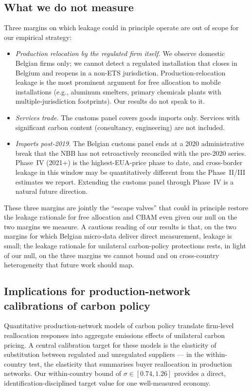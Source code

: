 \subsection{What we do not measure}

Three margins on which leakage could in principle operate are out of scope for our empirical strategy:

\begin{itemize}
    \item \emph{Production relocation by the regulated firm itself.} We observe domestic Belgian firms only; we cannot detect a regulated installation that closes in Belgium and reopens in a non-ETS jurisdiction. Production-relocation leakage is the most prominent argument for free allocation to mobile installations (e.g., aluminum smelters, primary chemicals plants with multiple-jurisdiction footprints). Our results do not speak to it.

    \item \emph{Services trade.} The customs panel covers goods imports only. Services with significant carbon content (consultancy, engineering) are not included.

    \item \emph{Imports post-2019.} The Belgian customs panel ends at a 2020 administrative break that the NBB has not retroactively reconciled with the pre-2020 series. Phase~IV (2021+) is the highest-EUA-price phase to date, and cross-border leakage in this window may be quantitatively different from the Phase~II/III estimates we report. Extending the customs panel through Phase~IV is a natural future direction.
\end{itemize}

These three margins are jointly the ``escape valves'' that could in principle restore the leakage rationale for free allocation and CBAM even given our null on the two margins we measure. A cautious reading of our results is that, on the two margins for which Belgian micro-data deliver direct measurement, leakage is small; the leakage rationale for unilateral carbon-policy protections rests, in light of our null, on the three margins we cannot bound and on cross-country heterogeneity that future work should map.

\subsection{Implications for production-network calibrations of carbon policy}

Quantitative production-network models of carbon policy \citep[e.g.,][]{baqaee2019,king2019,aghion2024} translate firm-level reallocation responses into aggregate emissions effects of unilateral carbon pricing. A central calibration target for these models is the elasticity of substitution between regulated and unregulated suppliers --- in the within-country test, the elasticity that summarises buyer reallocation in production networks. Our within-country bound of $\sigma \in [0.74, 1.26]$ provides a direct, identification-disciplined target value for one well-measured economy.

